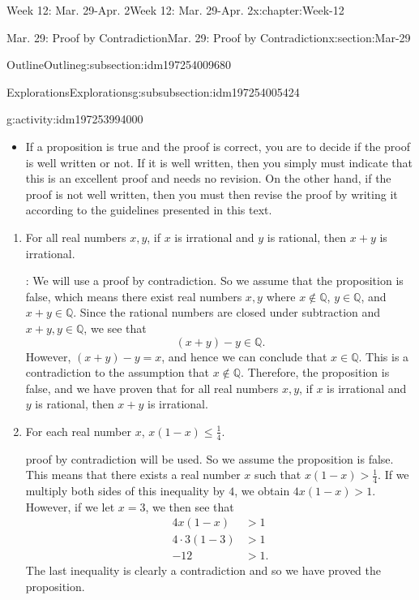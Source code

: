 \documentclass[oneside,10pt,]{book}
\numberwithin{equation}{section}
\renewcommand{\le}{\leqslant}
\def\Q{{\mathbb Q}}
\newcommand{\Q}{\mathbb Q}
\newcommand{\gt}{>}
\newcommand{\amp}{&}
\begin{document}
\begin{chapterptx}{Week 12: Mar. 29-Apr. 2}{}{Week 12: Mar. 29-Apr. 2}{}{}{x:chapter:Week-12}
\begin{sectionptx}{Mar. 29: Proof by Contradiction}{}{Mar. 29: Proof by Contradiction}{}{}{x:section:Mar-29}
\begin{subsectionptx}{Outline}{}{Outline}{}{}{g:subsection:idm197254009680}
\begin{subsubsectionptx}{Explorations}{}{Explorations}{}{}{g:subsubsection:idm197254005424}
\begin{activity}{}{g:activity:idm197253994000}
\begin{itemize}[label=\textbullet]
\item{}If a proposition is true and the proof is correct, you are to decide if the proof is well written or not. If it is well written, then you simply must indicate that this is an excellent proof and needs no revision. On the other hand, if the proof is not well written, then you must then revise the proof by writing it according to the guidelines presented in this text.%
\end{itemize}
%
%
\begin{enumerate}
\item{}For all real numbers \(x,y\), if \(x\) is irrational and \(y\) is rational, then \(x+y\) is irrational.%
\par\smallskip%
\noindentProof: We will use a proof by contradiction. So we assume that the proposition is false, which means there exist real numbers \(x,y\) where \(x\notin \Q\), \(y\in \Q\), and \(x+y\in \Q\). Since the rational numbers are closed under subtraction and \(x+y,y\in\Q\), we see that%
\begin{equation*}
(x+y)-y\in\Q.
\end{equation*}
However, \((x+y)-y = x\), and hence we can conclude that \(x\in\Q\). This is a contradiction to the assumption that \(x\notin \Q\). Therefore, the proposition is false, and we have proven that for all real numbers \(x,y\), if \(x\) is irrational and \(y\) is rational, then \(x+y\) is irrational.%
\item{}For each real number \(x\), \(x(1-x) \le \frac{1}{4}\).%
\par\smallskip%
\noindentA proof by contradiction will be used. So we assume the proposition is false. This means that there exists a real number \(x\) such that \(x(1-x) \gt \frac{1}{4}\). If we multiply both sides of this inequality by \(4\), we obtain \(4x(1-x) > 1\). However, if we let \(x=3\), we then see that%
\begin{align*}
4x (1-x) \amp \gt 1\\
4\cdot 3(1-3) \amp\gt 1 \\
-12 \amp \gt 1. 
\end{align*}
The last inequality is clearly a contradiction and so we have proved the proposition.%
\end{enumerate}
\end{activity}%
\end{subsubsectionptx}
\end{subsectionptx}
%
%
\typeout{************************************************}

\end{sectionptx}
\end{chapterptx}
\end{document}
